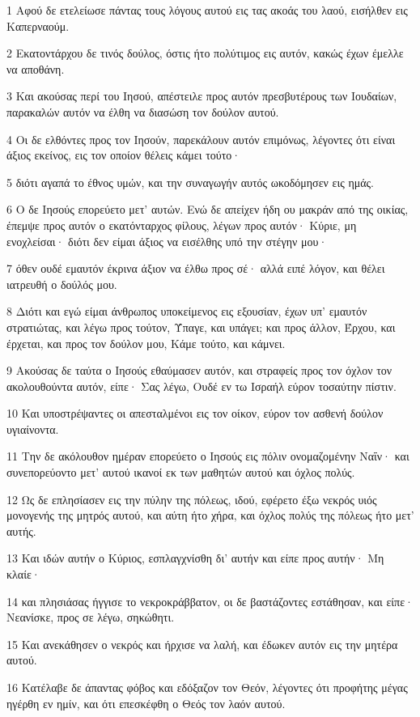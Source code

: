 \par 1 Αφού δε ετελείωσε πάντας τους λόγους αυτού εις τας ακοάς του λαού, εισήλθεν εις Καπερναούμ.
\par 2 Εκατοντάρχου δε τινός δούλος, όστις ήτο πολύτιμος εις αυτόν, κακώς έχων έμελλε να αποθάνη.
\par 3 Και ακούσας περί του Ιησού, απέστειλε προς αυτόν πρεσβυτέρους των Ιουδαίων, παρακαλών αυτόν να έλθη να διασώση τον δούλον αυτού.
\par 4 Οι δε ελθόντες προς τον Ιησούν, παρεκάλουν αυτόν επιμόνως, λέγοντες ότι είναι άξιος εκείνος, εις τον οποίον θέλεις κάμει τούτο·
\par 5 διότι αγαπά το έθνος υμών, και την συναγωγήν αυτός ωκοδόμησεν εις ημάς.
\par 6 Ο δε Ιησούς επορεύετο μετ' αυτών. Ενώ δε απείχεν ήδη ου μακράν από της οικίας, έπεμψε προς αυτόν ο εκατόνταρχος φίλους, λέγων προς αυτόν· Κύριε, μη ενοχλείσαι· διότι δεν είμαι άξιος να εισέλθης υπό την στέγην μου·
\par 7 όθεν ουδέ εμαυτόν έκρινα άξιον να έλθω προς σέ· αλλά ειπέ λόγον, και θέλει ιατρευθή ο δούλός μου.
\par 8 Διότι και εγώ είμαι άνθρωπος υποκείμενος εις εξουσίαν, έχων υπ' εμαυτόν στρατιώτας, και λέγω προς τούτον, Ύπαγε, και υπάγει; και προς άλλον, Έρχου, και έρχεται, και προς τον δούλον μου, Κάμε τούτο, και κάμνει.
\par 9 Ακούσας δε ταύτα ο Ιησούς εθαύμασεν αυτόν, και στραφείς προς τον όχλον τον ακολουθούντα αυτόν, είπε· Σας λέγω, Ουδέ εν τω Ισραήλ εύρον τοσαύτην πίστιν.
\par 10 Και υποστρέψαντες οι απεσταλμένοι εις τον οίκον, εύρον τον ασθενή δούλον υγιαίνοντα.
\par 11 Την δε ακόλουθον ημέραν επορεύετο ο Ιησούς εις πόλιν ονομαζομένην Ναΐν· και συνεπορεύοντο μετ' αυτού ικανοί εκ των μαθητών αυτού και όχλος πολύς.
\par 12 Ως δε επλησίασεν εις την πύλην της πόλεως, ιδού, εφέρετο έξω νεκρός υιός μονογενής της μητρός αυτού, και αύτη ήτο χήρα, και όχλος πολύς της πόλεως ήτο μετ' αυτής.
\par 13 Και ιδών αυτήν ο Κύριος, εσπλαγχνίσθη δι' αυτήν και είπε προς αυτήν· Μη κλαίε·
\par 14 και πλησιάσας ήγγισε το νεκροκράββατον, οι δε βαστάζοντες εστάθησαν, και είπε· Νεανίσκε, προς σε λέγω, σηκώθητι.
\par 15 Και ανεκάθησεν ο νεκρός και ήρχισε να λαλή, και έδωκεν αυτόν εις την μητέρα αυτού.
\par 16 Κατέλαβε δε άπαντας φόβος και εδόξαζον τον Θεόν, λέγοντες ότι προφήτης μέγας ηγέρθη εν ημίν, και ότι επεσκέφθη ο Θεός τον λαόν αυτού.
